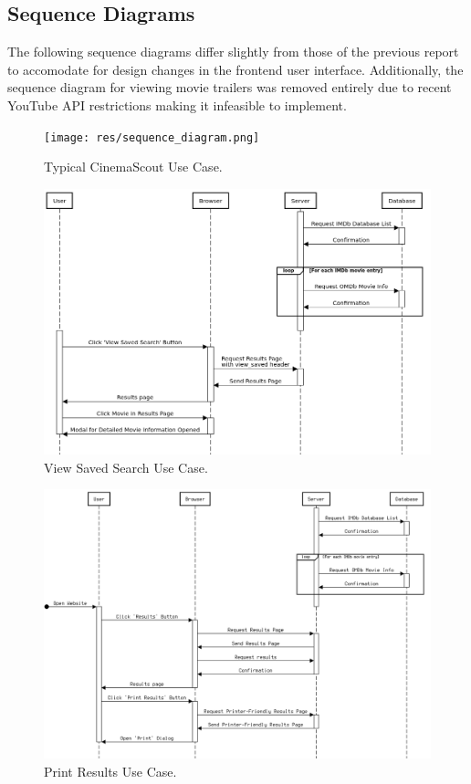 \documentclass{article}
\begin{document}
\subsection{Sequence Diagrams}
The following sequence diagrams differ slightly from those of the previous
report to accomodate for design changes in the frontend user interface. 
Additionally, the sequence diagram for viewing movie trailers was removed 
entirely due to recent YouTube API restrictions making it infeasible to
implement.
\begin{figure}[H]
\texttt{[image: res/sequence\_diagram.png]}
\caption{Typical CinemaScout Use Case.}
\end{figure}
\begin{figure}[H]
\includegraphics[width=\columnwidth]{res/sequence_diagram2.png}
\caption{View Saved Search Use Case.}
\end{figure}
\begin{figure}[H]
\includegraphics[width=\columnwidth]{res/sequence_diagram5.png}
\caption{Print Results Use Case.}
\end{figure}
\end{document}
